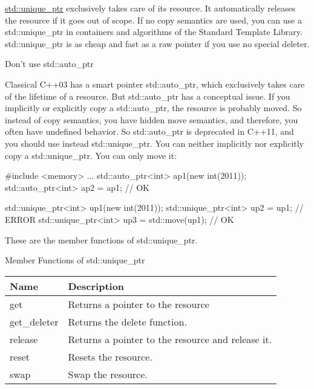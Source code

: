 
\href{http://en.cppreference.com/w/cpp/memory/unique_ptr}{std::unique\_ptr} exclusively takes care of its resource. It automatically releases the resource if it goes out of scope. If no copy semantics are used, you can use a std::unique\_ptr in containers and algorithms of the Standard Template Library. std::unique\_ptr is as cheap and fast as a raw pointer if you use no special deleter.

\begin{myWarning}{Don’t use std::auto\_ptr}

Classical C++03 has a smart pointer std::auto\_ptr, which exclusively takes care of the lifetime of a resource. But std::auto\_ptr has a conceptual issue. If you implicitly or explicitly copy a std::auto\_ptr, the resource is probably moved. So instead of copy semantics, you have hidden move semantics, and therefore, you often have undefined behavior. So std::auto\_ptr is deprecated in C++11, and you should use instead std::unique\_ptr. You can neither implicitly nor explicitly copy a std::unique\_ptr. You can only move it:

\begin{cpp}
#include <memory>
...
std::auto_ptr<int> ap1(new int(2011));
std::auto_ptr<int> ap2 = ap1; // OK

std::unique_ptr<int> up1(new int(2011));
std::unique_ptr<int> up2 = up1; // ERROR
std::unique_ptr<int> up3 = std::move(up1); // OK
\end{cpp}

\end{myWarning}

These are the member functions of std::unique\_ptr.

\begin{center}
Member Functions of std::unique\_ptr
\end{center}

\begin{longtable}[c]{|l|l|}
\hline
Name         & Description                                       \\ \hline
\endfirsthead
%
\endhead
%
get          & Returns a pointer to the resource                 \\ \hline
get\_deleter & Returns the delete function.                      \\ \hline
release      & Returns a pointer to the resource and release it. \\ \hline
reset        & Resets the resource.                              \\ \hline
swap         & Swap the resource.                                \\ \hline
\end{longtable}

